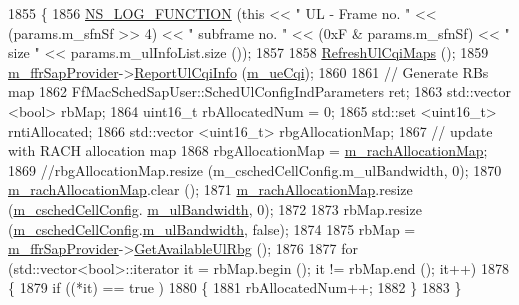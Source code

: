 \begin{DoxyCode}
1855 \{
1856   \hyperlink{log-macros-disabled_8h_a90b90d5bad1f39cb1b64923ea94c0761}{NS\_LOG\_FUNCTION} (\textcolor{keyword}{this} << \textcolor{stringliteral}{" UL - Frame no. "} << (params.m\_sfnSf >> 4) << \textcolor{stringliteral}{" subframe no. "} 
      << (0xF & params.m\_sfnSf) << \textcolor{stringliteral}{" size "} << params.m\_ulInfoList.size ());
1857 
1858   \hyperlink{classns3_1_1CqaFfMacScheduler_ad121d8c53a2aa28532e4ce32682d0dd2}{RefreshUlCqiMaps} ();
1859   \hyperlink{classns3_1_1CqaFfMacScheduler_a47eeb31f5d284b045d6deba40ac3e108}{m\_ffrSapProvider}->\hyperlink{classns3_1_1LteFfrSapProvider_a14e6bcaf7db6afcb42f75122717313b1}{ReportUlCqiInfo} (\hyperlink{classns3_1_1CqaFfMacScheduler_a263024e4342a26bfc2fabd0697da8641}{m\_ueCqi});
1860 
1861   \textcolor{comment}{// Generate RBs map}
1862   FfMacSchedSapUser::SchedUlConfigIndParameters ret;
1863   std::vector <bool> rbMap;
1864   uint16\_t rbAllocatedNum = 0;
1865   std::set <uint16\_t> rntiAllocated;
1866   std::vector <uint16\_t> rbgAllocationMap;
1867   \textcolor{comment}{// update with RACH allocation map}
1868   rbgAllocationMap = \hyperlink{classns3_1_1CqaFfMacScheduler_a813fe1147a11b3b5c34d9a345535a920}{m\_rachAllocationMap};
1869   \textcolor{comment}{//rbgAllocationMap.resize (m\_cschedCellConfig.m\_ulBandwidth, 0);}
1870   \hyperlink{classns3_1_1CqaFfMacScheduler_a813fe1147a11b3b5c34d9a345535a920}{m\_rachAllocationMap}.clear ();
1871   \hyperlink{classns3_1_1CqaFfMacScheduler_a813fe1147a11b3b5c34d9a345535a920}{m\_rachAllocationMap}.resize (\hyperlink{classns3_1_1CqaFfMacScheduler_ad5dc768ca3a3c71671fd64de7de8ec00}{m\_cschedCellConfig}.
      \hyperlink{structns3_1_1FfMacCschedSapProvider_1_1CschedCellConfigReqParameters_a5ab5b102878e6e7e7727a14af4a64d2f}{m\_ulBandwidth}, 0);
1872 
1873   rbMap.resize (\hyperlink{classns3_1_1CqaFfMacScheduler_ad5dc768ca3a3c71671fd64de7de8ec00}{m\_cschedCellConfig}.\hyperlink{structns3_1_1FfMacCschedSapProvider_1_1CschedCellConfigReqParameters_a5ab5b102878e6e7e7727a14af4a64d2f}{m\_ulBandwidth}, \textcolor{keyword}{false});
1874 
1875   rbMap = \hyperlink{classns3_1_1CqaFfMacScheduler_a47eeb31f5d284b045d6deba40ac3e108}{m\_ffrSapProvider}->\hyperlink{classns3_1_1LteFfrSapProvider_aafd23b22a27ec83e03d54795c122d175}{GetAvailableUlRbg} ();
1876 
1877   \textcolor{keywordflow}{for} (std::vector<bool>::iterator it = rbMap.begin (); it != rbMap.end (); it++)
1878     \{
1879       \textcolor{keywordflow}{if} ((*it) == true )
1880         \{
1881           rbAllocatedNum++;
1882         \}
1883     \}

\end{DoxyCode}
